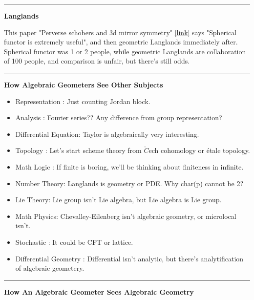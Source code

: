 \documentclass{article}
\begin{document}
\noindent\rule{\textwidth}{0.4pt}

\noindent
\textbf{Langlands}

\noindent
This paper "Perverse schobers and 3d mirror symmetry" \href{https://arxiv.org/pdf/2202.06833}{[link]}
says "Spherical functor is extremely useful", and then geometric Langlands immediately after. 
Spherical functor was 1 or 2 people, while geometric Langlands are collaboration of 100 people, and comparison is unfair, 
but there's still odds. \\




\noindent\rule{\textwidth}{0.4pt}

\noindent
\textbf{How Algebraic Geometers See Other Subjects}

\begin{itemize}
\item Representation : Just counting Jordan block.
\item Analysis : Fourier series?? Any difference from group representation?
\item Differential Equation: Taylor is algebraically very interesting.
\item Topology : Let's start scheme theory from $\check{C}$ech cohomology or \'etale topology.
\item Math Logic : If finite is boring, we'll be thinking about finiteness in infinite.
\item Number Theory: Langlands is geometry or PDE. Why char(p) cannot be 2?
\item Lie Theory: Lie group isn't Lie algebra, but Lie algebra is Lie group.
\item Math Physics: Chevalley-Eilenberg isn't algebraic geometry, or microlocal isn't.
\item Stochastic : It could be CFT or lattice.
\item Differential Geometry : Differential isn't analytic, but there's analytification of algebraic geometery.
\end{itemize}


\noindent\rule{\textwidth}{0.4pt}

\noindent
\textbf{How An Algebraic Geometer Sees Algebraic Geometry}
\end{document}
